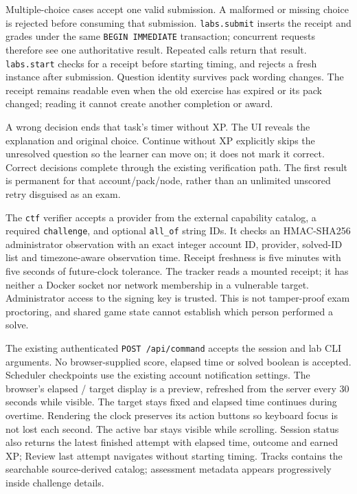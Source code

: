 Multiple-choice cases accept one valid submission. A malformed or missing choice
is rejected before consuming that submission. \texttt{labs.submit} inserts the
receipt and grades under the same \texttt{BEGIN IMMEDIATE} transaction; concurrent
requests therefore see one authoritative result. Repeated calls return that result.
\texttt{labs.start} checks for a receipt before starting timing, and rejects a fresh
instance after submission. Question identity survives pack wording changes. The
receipt remains readable even when the old exercise has expired or its pack changed;
reading it cannot create another completion or award.

A wrong decision ends that task's timer without XP. The UI reveals the explanation
and original choice. Continue without XP explicitly skips the unresolved question
so the learner can move on; it does not mark it correct. Correct decisions complete
through the existing verification path. The first result is permanent for that
account/pack/node, rather than an unlimited unscored retry disguised as an exam.

The \texttt{ctf} verifier accepts a provider from the external capability catalog,
a required \texttt{challenge}, and optional \texttt{all\_of} string IDs. It checks an
HMAC-SHA256 administrator observation with an exact integer account ID, provider,
solved-ID list and timezone-aware observation time. Receipt freshness is five minutes
with five seconds of future-clock tolerance. The tracker reads a mounted receipt;
it has neither a Docker socket nor network membership in a vulnerable target.
Administrator access to the signing key is trusted. This is not tamper-proof exam
proctoring, and shared game state cannot establish which person performed a solve.

The existing authenticated \texttt{POST /api/command} accepts the session and lab CLI
arguments. No browser-supplied score, elapsed time or solved boolean is accepted.
Scheduler checkpoints use the existing account notification settings. The browser's
elapsed / target display is a preview, refreshed from the server every 30 seconds
while visible. The target stays fixed and elapsed time continues during overtime.
Rendering the clock preserves its action buttons so keyboard focus is not lost each
second. The active bar stays visible while scrolling. Session status also returns
the latest finished attempt with elapsed time, outcome and earned XP; Review last
attempt navigates without starting timing. Tracks contains the searchable source-derived catalog; assessment metadata
appears progressively inside challenge details.

